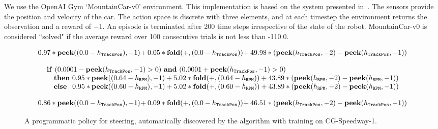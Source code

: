 We use the OpenAI Gym `MountainCar-v0' environment. This implementation is based on the system presented in~\citep{Moore-1991-15826}. The sensors provide the position and velocity of the car. The action space is discrete with three elements, and at each timestep the environment returns the observation and a reward of $-1$. An episode is terminated after 200 time steps irrespective of the state of the robot. MountainCar-v0  is considered ``solved" if the average reward over 100 consecutive trials is not less than -110.0.

\begin{figure}[h]
	\vskip 0.1in
	\begin{equation*}
	\begin{array}{l}
0.97 * \mathbf{peek}((0.0 - h_{\mathtt{TrackPos}}), -1) \hspace{-2pt}+ 0.05 * \mathbf{fold}(+, (0.0 - h_{\mathtt{TrackPos}}))   \hspace{-2pt}+ 49.98 * (\mathbf{peek}(h_{\mathtt{TrackPos}}, -2) - \mathbf{peek}(h_{\mathtt{TrackPos}}, -1))
	\end{array}
	\end{equation*}
	\caption{A programmatic policy for steering, automatically discovered by the \algo algorithm with training on Aalborg. 
	}
	\label{fig:codesteer}
	\begin{equation*}
	\begin{array}{l }
	\mathbf{if}~(0.0001 - \mathbf{peek}(h_{\mathtt{TrackPos}}, -1) > 0 )~\mathbf{and}~(0.0001 + \mathbf{peek}(h_{\mathtt{TrackPos}}, -1) > 0) \\
	\hspace{10pt} \mathbf{then}~ 0.95 * \mathbf{peek}((0.64 - h_{\mathtt{RPM}}), -1)+ 5.02 * \mathbf{fold}(+, (0.64 - h_{\mathtt{RPM}}))+ 43.89 * (\mathbf{peek}(h_{\mathtt{RPM}}, -2) - \mathbf{peek}(h_{\mathtt{RPM}}, -1)) \\
	\hspace{10pt} \mathbf{else}~ \;\, 0.95 * \mathbf{peek}((0.60 - h_{\mathtt{RPM}}), -1)+ 5.02 * \mathbf{fold}(+, (0.60 - h_{\mathtt{RPM}}))+ 43.89 * (\mathbf{peek}(h_{\mathtt{RPM}}, -2) - \mathbf{peek}(h_{\mathtt{RPM}}, -1))
	\end{array}
	\end{equation*}
	\caption{A programmatic policy for acceleration, automatically discovered by the \algo algorithm with training on CG-Speedway-1.}
	\label{fig:cgaccel}
	\begin{equation*}
	\begin{array}{l }
0.86 * \mathbf{peek}((0.0 - h_{\mathtt{TrackPos}}), -1) \hspace{-2pt}+ 0.09 * \mathbf{fold}(+, (0.0 - h_{\mathtt{TrackPos}}))   \hspace{-2pt}+ 46.51 * (\mathbf{peek}(h_{\mathtt{TrackPos}}, -2) - \mathbf{peek}(h_{\mathtt{TrackPos}}, -1))
	\end{array}
	\end{equation*}
	\caption{A programmatic policy for steering, automatically discovered by the \algo algorithm with training on CG-Speedway-1.}
	\label{fig:cgsteer}
\end{figure}

